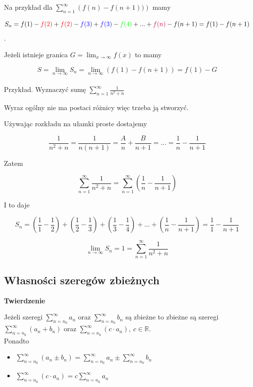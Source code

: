 Na przykład dla $ \sum\limits_{n = 1}^{\infty} \left( f(n) - f(n + 1)) \right) $ mamy

$$ S_n = f(1) - \textcolor{red}{f(2)} + \textcolor{red}{f(2)} - \textcolor{blue}{f(3)} + \textcolor{blue}{f(3)} - 
\textcolor{green}{f(4)} + ... + \textcolor{purple}{f(n)} - f(n + 1) = f(1) - f(n + 1) $$.

Jeżeli istnieje granica $ G = \lim_{x \to \infty} f(x) $ to mamy

$$ S = \lim_{n \to \infty} S_n = \lim_{n \to \infty} \left( f(1) - f(n + 1) \right) = f(1) - G $$ \\

Przykład. Wyznaczyć sumę $ \sum\limits_{n = 1}^{\infty} \frac{1}{n^2 + n} $

Wyraz ogólny nie ma postaci różnicy więc trzeba ją stworzyć.

Używając rozkładu na ułamki proste dostajemy

$$ \frac{1}{n^2 + n} = \frac{1}{n(n+1)} = \frac{A}{n} + \frac{B}{n+1} = ... = \frac{1}{n} - \frac{1}{n+1} $$

Zatem 

$$ \sum\limits_{n = 1}^{\infty} \frac{1}{n^2 + n} = \sum\limits_{n=1}^{\infty} \left( \frac{1}{n} - \frac{1}{n+1} \right) $$

I to daje

$$ S_n = \left( \frac{1}{1} - \frac{1}{2} \right) + \left( \frac{1}{2} - \frac{1}{3} \right) + \left( \frac{1}{3} - \frac{1}{4} \right)
+ ... + \left( \frac{1}{n} - \frac{1}{n+1} \right) = \frac{1}{1} - \frac{1}{n+1}  $$ 

$$ \lim_{n \to \infty} S_n = 1 = \sum\limits_{n = 1}^{\infty} \frac{1}{n^2 + n} $$

\subsection*{Własności szeregów zbieżnych}

\textbf{Twierdzenie}

Jeżeli szeregi $ \sum\limits_{n = n_0}^{\infty} a_n $ oraz $ \sum\limits_{n = n_0}^{\infty} b_n $ są zbieżne to zbieżne są szeregi
$ \sum\limits_{n = n_0}^{\infty} (a_n + b_n) $ \linebreak oraz $ \sum\limits_{n = n_0}^{\infty} (c \cdot a_n), \ c \in \mathbb{R} $. \\

Ponadto

\begin{itemize}
    \item $ \sum\limits_{n = n_0}^{\infty} (a_n \pm b_n) = \sum\limits_{n = n_0}^{\infty} a_n \pm \sum\limits_{n = n_0}^{\infty} b_n $
    \item $ \sum\limits_{n = n_0}^{\infty} (c \cdot a_n) = c \sum\limits_{n = n_0}^{\infty} a_n $ \\
\end{itemize}

